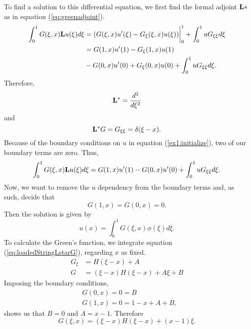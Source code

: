 \begin{example}
    To find a solution to this differential equation, we first find the formal adjoint \(\mathrm{\bf{L}}*\) as in equation (\ref{eq:greenadjoint}). 
    \begin{equation}
        \begin{split}
            \int_{0}^{1} G(\xi, x)\mathrm{\bf{L}} u(\xi) d\xi  &= (G(\xi, x)u'(\xi)-G_\xi (\xi, x)u(\xi))\biggr\rvert_0^1 + \int_{0}^{1} uG_{\xi\xi}d\xi\\
            &= G(1, x)u'(1) - G_\xi(1, x)u(1) \\&- G(0, x)u'(0) + G_\xi(0,x)u(0) + \int_{0}^{1} uG_{\xi\xi}d\xi.
        \end{split}
    \end{equation}
    Therefore, 
    \begin{equation}
        \mathrm{\bf{L^*}} = \frac{d^2}{d\xi^2}
    \end{equation}
    and 
    \begin{equation}\label{eq:loadedStringLstarG}
        \mathrm{\bf{L^*}} G = G_{\xi\xi} = \delta(\xi-x).
    \end{equation}
    Because of the boundary conditions on \(u\) in equation (\ref{ex1:initialize}), two of our boundary terms are zero. Thus,
    \begin{equation}
        \int_{0}^{1} G(\xi, x)\mathrm{\bf{L}} u(\xi) d\xi = G(1, x)u'(1) - G(0, x)u'(0) + \int_{0}^{1} uG_{\xi\xi}d\xi.
    \end{equation}
    Now, we want to remove the \(u\) dependency from the boundary terms and, as such, decide that
    \begin{equation}
        G(1,x) = G(0,x) = 0.
    \end{equation}
    Then the solution is given by 
    \begin{equation}\label{eq:loadSln}
        u(x) = \int_0^1 G(\xi,x)\phi(\xi)d\xi.
    \end{equation}
    To calculate the Green's function, we integrate equation (\ref{eq:loadedStringLstarG}), regarding \(x\) as fixed.
    \begin{equation}
        \begin{split}
            G_\xi &= H(\xi-x) + A\\
            G &= (\xi - x)H(\xi-x)+A\xi +B
        \end{split}
    \end{equation}
    Imposing the boundary conditions, 
    \begin{equation}
        \begin{split}
            &G(0,x) = 0 = B\\
            &G(1,x) = 0 =  1 - x + A + B,
        \end{split}
    \end{equation}
    shows us that \(B=0\) and  \(A=x-1\). Therefore
    \begin{equation}
        G(\xi,x) = (\xi-x)H(\xi-x) + (x-1)\xi.
    \end{equation}


\end{example}
